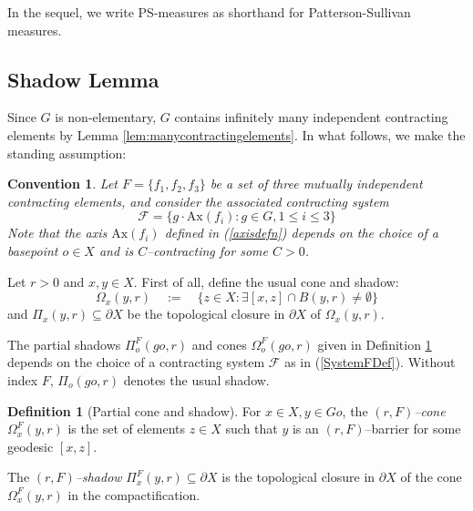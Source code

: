 \documentclass{amsart}
\newtheorem{conv}[thm]{Convention}
\theoremstyle{definition}
\newtheorem{defn}[thm]{Definition}
\theoremstyle{remark}
\newcommand{\f}{\mathscr F}
\newcommand{\U}{ X}
\newcommand{\pU}{\partial{  X}}
\newcommand{\ax}{\mathrm{Ax}}
\begin{document}
  

In the sequel, we write PS-measures as shorthand for
Patterson-Sullivan measures.
 
 
\subsection{Shadow Lemma}\label{SSshadowlem}
Since $G$ is non-elementary, $G$ contains infinitely many independent contracting elements by Lemma \ref{lem:manycontractingelements}.  In what follows, we make the standing assumption:
\begin{conv}\label{ConventionF}
    Let  $F=\{f_1,f_2,f_3\}$ be a set of three mutually independent contracting elements, and consider the associated contracting system  
\begin{equation}\label{SystemFDef}
\f =\{g\cdot \ax(f_i):   g\in G, 1\le i\le 3\}
\end{equation}
Note that  the axis $\ax(f_i)$    defined in (\ref{axisdefn})  depends on the choice of a basepoint $o\in \U$ and  is $C$--contracting for some $C>0$.   
\end{conv}



Let $r>0$ and $x, y\in \U$. 
First of all, define the usual cone and shadow:  
$$\Omega_{x}(y, r)\quad :=\quad \{z\in \U: \exists [x,z]\cap B(y,r)\ne\emptyset\}$$
and $\Pi_{x}(y, r) \subseteq \pU$ be the topological closure  in $\pU$ of $\Omega_{x}(y, r)$.



 
The partial shadows $\Pi_o^F(go, r)$ and cones $\Omega_o^F(go, r)$   given in Definition \ref{ShadowDef} depends on the choice of a contracting system $\f$ as in (\ref{SystemFDef}). Without index $F$,   $\Pi_o(go, r)$   denotes the     usual shadow. 
 




 
\begin{defn}[Partial cone and shadow]\label{ShadowDef}
For $x\in \U, y\in Go$, the \textit{$(r, F)$--cone} $\Omega_{x}^F(y, r)$ is the set of elements $z\in \U$ such that $y$ is an $(r, F)$--barrier for some geodesic $[x, z]$.  %

The \textit{$(r, F)$--shadow} $\Pi_{x}^F(y, r) \subseteq \pU$ is the topological closure  in $\pU$ of the cone $\Omega_{x}^F(y, r)$ in the compactification.
\end{defn}
\end{document}
